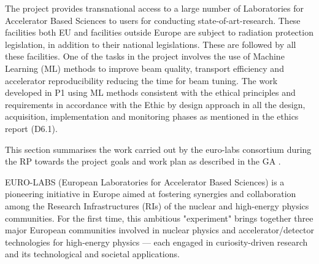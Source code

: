 {The project provides transnational access to a large number of Laboratories for Accelerator Based Sciences to users for conducting state-of-art-research.  These facilities both EU and facilities outside Europe are subject to radiation protection legislation, in addition to their national legislations. These are followed by all these facilities.  One of the tasks in the project involves the use of Machine Learning (ML) methods to improve beam quality, transport efficiency and accelerator reproducibility reducing the time for beam tuning. The work developed in P1 using ML methods consistent with the ethical principles and requirements in accordance with the Ethic by design approach in all the design, acquisition, implementation and monitoring phases as mentioned in the ethics report (D6.1).


This section summarises the work carried out by the \acrshort{euro-labs} consortium during the  \acrshort{RP} towards the project goals and work plan as described in the \acrfull{GA} \cite{bib:grantagreement2020}.} 

EURO-LABS (European Laboratories for Accelerator Based Sciences) is a pioneering initiative in Europe aimed at fostering synergies and collaboration among the Research Infrastructures (RIs) of the nuclear and high-energy physics communities. For the first time, this ambitious "experiment" brings together three major European communities involved in nuclear physics and accelerator/detector technologies for high-energy physics — each engaged in curiosity-driven research and its technological and societal applications.

